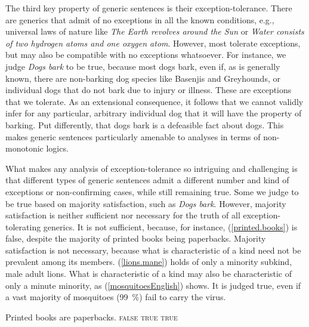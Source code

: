 \documentclass[output=paper,colorlinks,citecolor=brown]{langscibook}
\begin{document}
The third key property of generic sentences is their exception-tolerance. 
There are generics that admit of no exceptions in all the known conditions, e.g., universal laws of nature 
like \textit{The Earth revolves around the Sun} 
or \textit{Water consists of two hydrogen atoms and one oxygen atom}. However,
most tolerate exceptions, but may also be compatible with no exceptions whatsoever.
For instance, we judge \textit{Dogs bark} to be true,
because most dogs bark, even if, as is generally known, 
there are non-barking dog species like Basenjis and Greyhounds, or individual 
dogs that do not bark due to injury or illness.
These are exceptions that we tolerate.
As an extensional consequence, it follows that
we cannot validly infer for any particular, arbitrary individual dog that it will have the property of barking. Put differently, that dogs bark is a defeasible fact about dogs. 
This makes generic sentences particularly amenable to 
analyses in terms of non-monotonic logics. 


What makes any analysis of exception-tolerance
so intriguing and challenging is 
that different types of generic sentences admit a different number and kind of exceptions 
or non-confirming cases, while still remaining true. 
Some we judge to be true based on majority satisfaction, 
such as \textit{Dogs bark}.  However, majority 
satisfaction is neither sufficient nor necessary for the truth of all exception-tolerating generics. It is not sufficient, because, for instance, (\ref{printed.books})
is false, despite the majority of printed books being paperbacks. Majority satisfaction is not necessary, because 
what is characteristic of a kind need not be prevalent among its members. (\ref{lions.mane}) holds of only a minority subkind, male adult lions.
What is characteristic of a kind may also be characteristic of only
a minute minority, as 
(\ref{mosquitoesEnglish}) shows. It is judged true, even if a 
vast majority of mosquitoes (\qty{99}{\percent}) fail to carry the virus.

\ea
\ea
 \label{printed.books} Printed books are paperbacks. \hfill \textsc{false}
 \hfill \textsc{true}
 \hfill \textsc{true}\\ 
\z
\z
\end{document}
